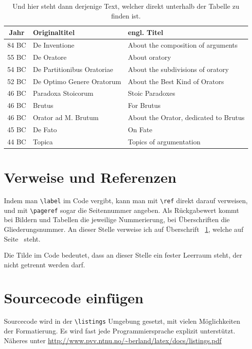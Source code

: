 \begin{table}[!t]
	\centering
	\begin{tabular}{cll}\hline\hline
	Jahr & Originaltitel & engl. Titel \\ \hline
	84 BC & De Inventione & About the composition of arguments \\
	55 BC & De Oratore & About oratory \\
	54 BC & De Partitionibus Oratoriae & About the subdivisions of oratory \\
	52 BC & De Optimo Genere Oratorum & About the Best Kind of Orators \\
	46 BC & Paradoxa Stoicorum & Stoic Paradoxes \\
	46 BC & Brutus & For Brutus \\
	46 BC & Orator ad M. Brutum & About the Orator, dedicated to Brutus \\
	45 BC & De Fato & On Fate \\
	44 BC & Topica & Topics of argumentation \\ \hline\hline
	\end{tabular}
	\caption[Dies ist der Kurztitel fürs Verzeichnis]{Und hier steht dann derjenige Text, welcher direkt unterhalb der Tabelle zu finden ist.}
	\label{tab:WerkCicero} 	%
\end{table}


\section{Verweise und Referenzen}
\label{sec:references}

Indem man \verb+\label+ im Code vergibt, kann man mit \verb+\ref+ direkt darauf verweisen, und mit \verb+\pageref+ sogar die Seitennummer angeben. Als Rückgabewert kommt bei Bildern und Tabellen die jeweilige Nummerierung, bei Überschriften die Gliederungsnummer. An dieser Stelle verweise ich auf Überschrift~ \ref{sec:references}, welche auf Seite~ \pageref{sec:references} steht.

Die Tilde im Code bedeutet, dass an dieser Stelle ein fester Leerraum steht, der nicht getrennt werden darf.


\section{Sourcecode einfügen}
Sourcecode wird in der \verb+\listings+ Umgebung gesetzt, mit vielen Möglichkeiten der Formatierung. Es wird fast jede Programmiersprache explizit unterstützt. Näheres unter \url{http://www.pvv.ntnu.no/~berland/latex/docs/listings.pdf}

